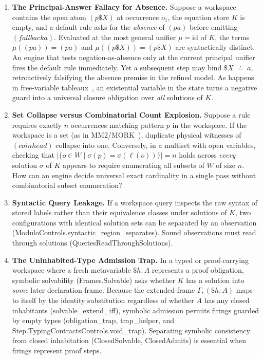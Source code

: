 \documentclass[11pt,a4paper]{article}
\theoremstyle{definition}
\DeclareRobustCommand{\lean}[1]{%
  \ifmmode\text{\normalfont\ttfamily\footnotesize\detokenize{#1}}%
  \else{\normalfont\footnotesize\leanurl{#1}}\fi}
\DeclareRobustCommand{\metta}[1]{\text{\normalfont\ttfamily\footnotesize #1}}
\def\lean#1{#1}%
\def\metta#1{#1}%
\newcommand{\doteqStore}{\;\doteq\;}
\begin{document}
\begin{enumerate}[leftmargin=2em,label=\textbf{P\arabic*.}]
  \item \textbf{The Principal-Answer Fallacy for Absence.}
  Suppose a workspace contains the open atom $\metta{(p \$X)}$ at occurrence $o_1$, the equation store $K$ is empty, and a default rule asks for the \emph{absence} of $\metta{(p a)}$ before emitting $\metta{(fallback a)}$. Evaluated at the most general unifier $\mu = \mathrm{id}$ of $K$, the terms $\mu(\metta{(p a)}) = \metta{(p a)}$ and $\mu(\metta{(p \$X)}) = \metta{(p \$X)}$ are syntactically distinct. An engine that tests negation-as-absence only at the current principal unifier fires the default rule immediately. Yet a subsequent step may bind $\$X \doteqStore \metta{a}$, retroactively falsifying the absence premise in the refined model. As happens in free-variable tableaux~\cite{Fitting1996Tableaux,Hahnle2001Tableaux}, an existential variable in the state turns a negative guard into a universal closure obligation over \emph{all} solutions of $K$.

  \item \textbf{Set Collapse versus Combinatorial Count Explosion.}
  Suppose a rule requires exactly $n$ occurrences matching pattern $p$ in the workspace. If the workspace is a set (as in MM2/MORK~\cite{Goertzel2023MeTTa}), duplicate physical witnesses of $\metta{(coin head)}$ collapse into one. Conversely, in a multiset with open variables, checking that $|\{o \in W \mid \sigma(p) = \sigma(\ell(o))\}| = n$ holds across \emph{every} solution $\sigma$ of $K$ appears to require enumerating all subsets of $W$ of size $n$. How can an engine decide universal exact cardinality in a single pass without combinatorial subset enumeration?

  \item \textbf{Syntactic Query Leakage.}
  If a workspace query inspects the raw syntax of stored labels rather than their equivalence classes under solutions of $K$, two configurations with identical solution sets can be separated by an observation (\lean{ModuloControls.syntactic_region_separates}). Sound observations must read through solutions (\lean{QueriesReadThroughSolutions}).

  \item \textbf{The Uninhabited-Type Admission Trap.}
  In a typed or proof-carrying workspace where a fresh metavariable $\$h : A$ represents a proof obligation, symbolic solvability (\lean{Frames.Solvable}) asks whether $K$ has a solution into \emph{some} later declaration frame. Because the extended frame $\Gamma, (\$h : A)$ maps to itself by the identity substitution regardless of whether $A$ has any closed inhabitants (\lean{solvable_extend_iff}), symbolic admission permits firings guarded by empty types (\lean{obligation_trap}, \lean{trap_helper}, and \lean{Step.TypingContractsControls.void_trap}). Separating symbolic consistency from closed inhabitation (\lean{ClosedSolvable}, \lean{ClosedAdmits}) is essential when firings represent proof steps.
\end{enumerate}
\end{document}
